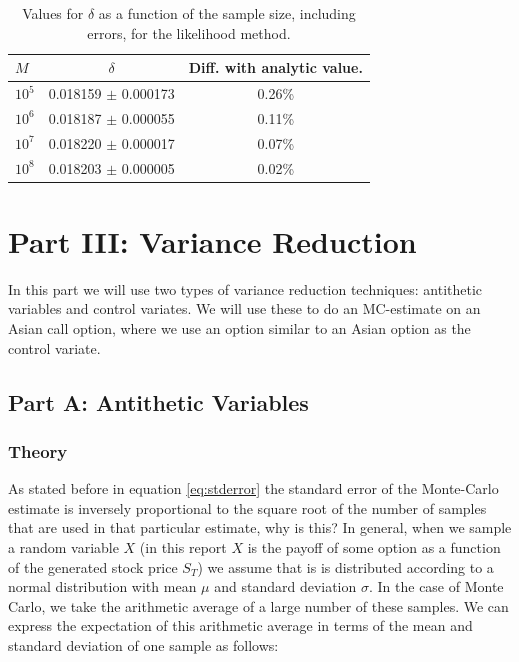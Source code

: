 \documentclass[11pt,a4paper]{article}
\begin{document}
\begin{table}[H]
  \centering
  \begin{tabular}{l || c | c}
    $M$ & $\delta$ & Diff. with analytic value.\\
    \hline
    $10^5$ & 0.018159 $\pm$ 0.000173 & 0.26\% \\
    $10^6$ & 0.018187 $\pm$ 0.000055 & 0.11\% \\
    $10^7$ & 0.018220 $\pm$ 0.000017 & 0.07\% \\
    $10^8$ & 0.018203 $\pm$ 0.000005 & 0.02\% \\
  \end{tabular}
  \caption{Values for $\delta$ as a function of the sample size, including errors, for the likelihood method.}
  \label{tab:likelihood}
\end{table}

\newpage

\section{Part III: Variance Reduction}
In this part we will use two types of variance reduction techniques: antithetic variables and control variates. We will use these to do an MC-estimate on an Asian call option, where we use an option similar to an Asian option as the control variate.

\subsection{Part A: Antithetic Variables}

\subsubsection{Theory}

As stated before in equation \ref{eq:stderror} the standard error of the Monte-Carlo estimate is inversely proportional to the square root of the number of samples that are used in that particular estimate, why is this? In general, when we sample a random variable $X$ (in this report $X$ is the payoff of some option as a function of the generated stock price $S_T$) we assume that is is distributed according to a normal distribution with mean $\mu$ and standard deviation $\sigma$. In the case of Monte Carlo, we take the arithmetic average of a large number of these samples. We can express the expectation of this arithmetic average in terms of the mean and standard deviation of one sample as follows:
\end{document}
